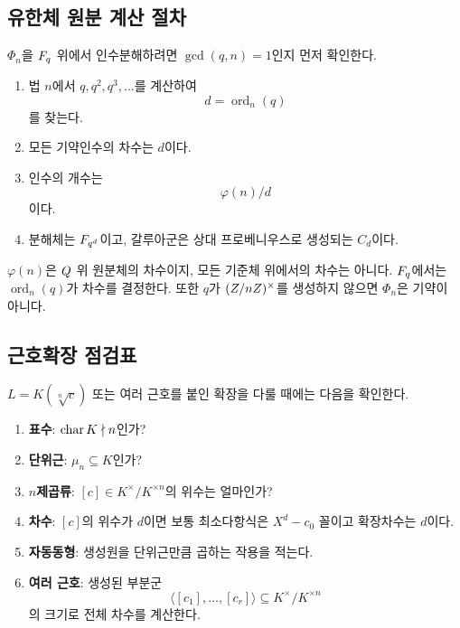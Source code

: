 \subsection{유한체 원분 계산 절차}

$\Phi_n$을 $F_q$ 위에서 인수분해하려면 $\gcd(q,n)=1$인지 먼저 확인한다.

\begin{enumerate}[label=\textbf{단계 \arabic*.},leftmargin=*]
  \item 법 $n$에서 $q,q^2,q^3,\dots$를 계산하여
  \[
    d=\operatorname{ord}_n(q)
  \]
  를 찾는다.
  \item 모든 기약인수의 차수는 $d$이다.
  \item 인수의 개수는
  \[
    \varphi(n)/d
  \]
  이다.
  \item 분해체는 $F_{q^d}$이고, 갈루아군은 상대 프로베니우스로 생성되는 $C_d$이다.
\end{enumerate}

\begin{pitfall}
$\varphi(n)$은 $Q$ 위 원분체의 차수이지, 모든 기준체 위에서의 차수는 아니다. $F_q$에서는 $\operatorname{ord}_n(q)$가 차수를 결정한다. 또한 $q$가 $(Z/nZ)^\times$를 생성하지 않으면 $\Phi_n$은 기약이 아니다.
\end{pitfall}

\subsection{근호확장 점검표}

$L=K(\sqrt[n]{c})$ 또는 여러 근호를 붙인 확장을 다룰 때에는 다음을 확인한다.

\begin{enumerate}[label=\textbf{단계 \arabic*.},leftmargin=*]
  \item \textbf{표수}: $\operatorname{char} K\nmid n$인가?
  \item \textbf{단위근}: $\mu_n\subseteq K$인가?
  \item \textbf{$n$제곱류}: $[c]\in K^\times/K^{\times n}$의 위수는 얼마인가?
  \item \textbf{차수}: $[c]$의 위수가 $d$이면 보통 최소다항식은 $X^d-c_0$ 꼴이고 확장차수는 $d$이다.
  \item \textbf{자동동형}: 생성원을 단위근만큼 곱하는 작용을 적는다.
  \item \textbf{여러 근호}: 생성된 부분군
  \[
    \langle[c_1],\dots,[c_r]\rangle
    \subseteq K^\times/K^{\times n}
  \]
  의 크기로 전체 차수를 계산한다.
\end{enumerate}

